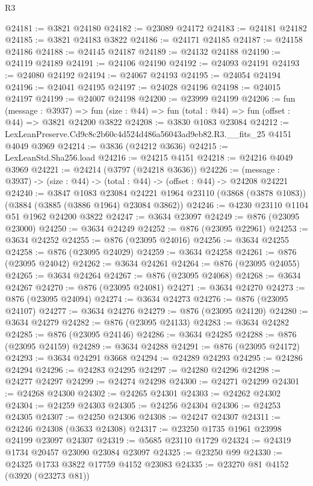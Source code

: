\begin{lexlean}{R3}
\begin{coremodule}
@24181 := @3821 @24180
@24182 := @23089 @24172
@24183 := @24181 @24182
@24185 := @3821 @24183 @3822
@24186 := @24171 @24185
@24187 := @24158 @24186
@24188 := @24145 @24187
@24189 := @24132 @24188
@24190 := @24119 @24189
@24191 := @24106 @24190
@24192 := @24093 @24191
@24193 := @24080 @24192
@24194 := @24067 @24193
@24195 := @24054 @24194
@24196 := @24041 @24195
@24197 := @24028 @24196
@24198 := @24015 @24197
@24199 := @24007 @24198
@24200 := @23999 @24199
@24206 := fun (message : @3937) =>
  fun (size : @44) => fun (total : @44) => fun (offset : @44) => @3821 @24200 @3822
@24208 := @3830 @1083 @23084
@24212 := LexLeanPreserve.Cd9c8c2b60c4d524d486a56043ad9eb82.R3.__fits_25 @4151 @4049 @3969
@24214 := @3836 (@24212 @3636)
@24215 := LexLeanStd.Sha256.load
@24216 := @24215 @4151
@24218 := @24216 @4049 @3969
@24221 := @24214 (@3797 (@24218 @3636))
@24226 := (message : @3937) -> (size : @44) -> (total : @44) -> (offset : @44) -> @24208 @24221
@24240 := @3847
    @1083
    @23084
    @24221
    @1964
    @23110
    (@3868 (@3878 @1083))
    (@3884 (@3885 (@3886 @1964) @23084 @3862))
@24246 := @4230 @23110 @1104 @51 @1962 @24200 @3822
@24247 := @3634 @23097
@24249 := @876 (@23095 @23000)
@24250 := @3634 @24249
@24252 := @876 (@23095 @22961)
@24253 := @3634 @24252
@24255 := @876 (@23095 @24016)
@24256 := @3634 @24255
@24258 := @876 (@23095 @24029)
@24259 := @3634 @24258
@24261 := @876 (@23095 @24042)
@24262 := @3634 @24261
@24264 := @876 (@23095 @24055)
@24265 := @3634 @24264
@24267 := @876 (@23095 @24068)
@24268 := @3634 @24267
@24270 := @876 (@23095 @24081)
@24271 := @3634 @24270
@24273 := @876 (@23095 @24094)
@24274 := @3634 @24273
@24276 := @876 (@23095 @24107)
@24277 := @3634 @24276
@24279 := @876 (@23095 @24120)
@24280 := @3634 @24279
@24282 := @876 (@23095 @24133)
@24283 := @3634 @24282
@24285 := @876 (@23095 @24146)
@24286 := @3634 @24285
@24288 := @876 (@23095 @24159)
@24289 := @3634 @24288
@24291 := @876 (@23095 @24172)
@24293 := @3634 @24291 @3668
@24294 := @24289 @24293
@24295 := @24286 @24294
@24296 := @24283 @24295
@24297 := @24280 @24296
@24298 := @24277 @24297
@24299 := @24274 @24298
@24300 := @24271 @24299
@24301 := @24268 @24300
@24302 := @24265 @24301
@24303 := @24262 @24302
@24304 := @24259 @24303
@24305 := @24256 @24304
@24306 := @24253 @24305
@24307 := @24250 @24306
@24308 := @24247 @24307
@24311 := @24246 @24308 (@3633 @24308)
@24317 := @23250 @1735 @1961 @23998 @24199 @23097 @24307
@24319 := @5685 @23110 @1729
@24324 := @24319 @1734 @20457 @23090 @23084 @23097
@24325 := @23250 @99
@24330 := @24325 @1733 @3822 @17759 @4152 @23083
@24335 := @23270 @81 @4152 (@3920 (@23273 @81))

\end{coremodule}
\end{lexlean}
